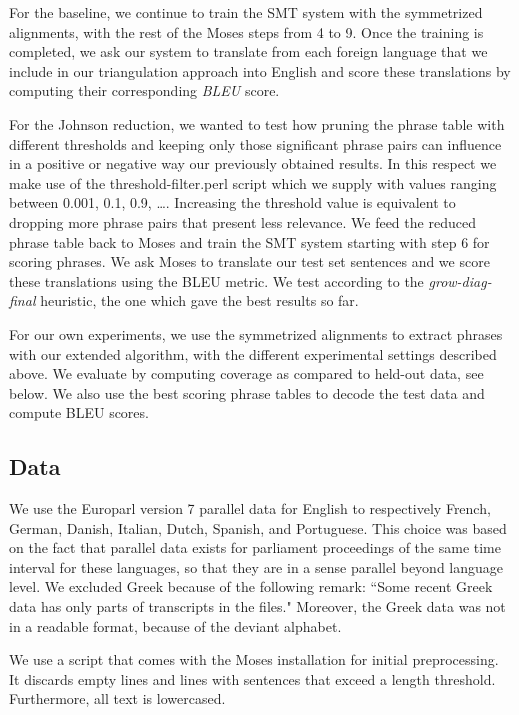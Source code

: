\documentclass[11pt]{article}
\begin{document}
For the baseline, we continue to train the SMT system with the symmetrized alignments, with the rest of the Moses steps from 4 to 9. Once the training is completed, we ask our system to translate from each foreign language that we include in our triangulation approach into English and score these translations by computing their corresponding \textit{BLEU} score. 

For the Johnson reduction, we wanted to test how pruning the phrase table with different thresholds and keeping only those significant phrase pairs can influence in a positive or negative way our previously obtained results. In this respect we make use of the threshold-filter.perl script which we supply with values ranging between 0.001, 0.1, 0.9, \ldots. Increasing the threshold value is equivalent to dropping more phrase pairs that present less relevance. We feed the reduced phrase table back to Moses and train the SMT system starting with step 6 for scoring phrases. We ask Moses to translate our test set sentences and we score these translations using the BLEU metric.  We test according to the \textit{grow-diag-final} heuristic, the one which gave the best results so far.

For our own experiments, we use the symmetrized alignments to extract phrases with our extended algorithm, with the different experimental settings described above. We evaluate by computing coverage as compared to held-out data, see below. We also use the best scoring phrase tables to decode the test data and compute BLEU scores.


\subsection{Data}

We use the Europarl version 7 parallel data for English to respectively French, German, Danish, Italian, Dutch, Spanish, and Portuguese. This choice was based on the fact that parallel data exists for parliament proceedings of the same time interval for these languages, so that they are in a sense parallel beyond language level.
We excluded Greek because of the following remark: ``Some recent Greek data has only parts of transcripts in the files." Moreover, the Greek data was not in a readable format, because of the deviant alphabet.

We use a script that comes with the Moses installation for initial preprocessing. It discards empty lines and lines with sentences that exceed a length threshold. Furthermore, all text is lowercased.
\end{document}
